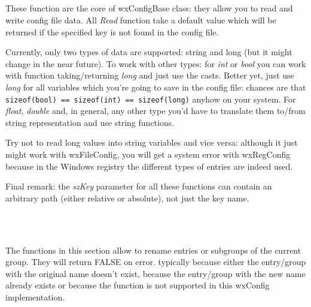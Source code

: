 
\\
\\
\\


\\


These function are the core of wxConfigBase class: they allow you to read and
write config file data. All {\it Read} function take a default value which
will be returned if the specified key is not found in the config file.

Currently, only two types of data are supported: string and long (but it might
change in the near future). To work with other types: for {\it int} or {\it
bool} you can work with function taking/returning {\it long} and just use the
casts. Better yet, just use {\it long} for all variables which you're going to
save in the config file: chances are that \verb$sizeof(bool) == sizeof(int) == sizeof(long)$ anyhow on your system. For {\it float}, {\it double} and, in
general, any other type you'd have to translate them to/from string
representation and use string functions.

Try not to read long values into string variables and vice versa: although it
just might work with wxFileConfig, you will get a system error with
wxRegConfig because in the Windows registry the different types of entries are
indeed used.

Final remark: the {\it szKey} parameter for all these functions can contain an
arbitrary path (either relative or absolute), not just the key name.

\\
\\


The functions in this section allow to rename entries or subgroups of the
current group. They will return FALSE on error. typically because either the
entry/group with the original name doesn't exist, because the entry/group with
the new name already exists or because the function is not supported in this
wxConfig implementation.

